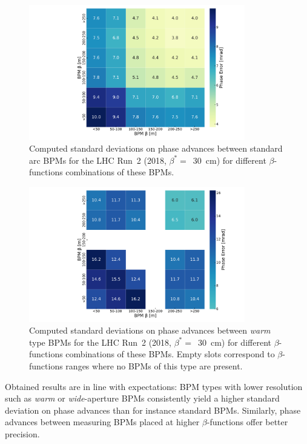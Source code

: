 \begin{figure}[!htb]
    \centering
    \includegraphics*[width=0.84\textwidth]{Figures/Other_Studies/phase_stdev_heatmap_mrad_standard_standard.pdf}
    \caption{Computed standard deviations on phase advances between standard arc BPMs for the LHC Run~\num{2} (\num{2018}, \(\beta^{\ast} =\)~\qty{30}{\centi\meter}) for different \(\beta\)-functions combinations of these BPMs.}
    \label{figure:phase_error_heatmap_standard_bpms}
\end{figure}

\begin{figure}[!htb]
    \centering
    \includegraphics*[width=0.84\textwidth]{Figures/Other_Studies/phase_stdev_heatmap_mrad_warm_warm.pdf}
    \caption{Computed standard deviations on phase advances between \textit{warm} type BPMs for the LHC Run~\num{2} (\num{2018}, \(\beta^{\ast} =\)~\qty{30}{\centi\meter}) for different \(\beta\)-functions combinations of these BPMs. Empty slots correspond to \(\beta\)-functions ranges where no BPMs of this type are present.}
    \label{figure:phase_error_heatmap_warm_bpms}
\end{figure}

Obtained results are in line with expectations: BPM types with lower resolution such as \textit{warm} or \textit{wide}-aperture BPMs consistently yield a higher standard deviation on phase advances than for instance standard BPMs.
Similarly, phase advances between measuring BPMs placed at higher \(\beta\)-functions offer better precision.

